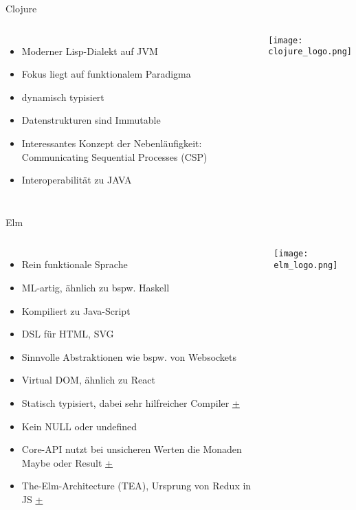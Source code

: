 \documentclass[compress]{beamer}
\begin{document}
\begin{frame}{Clojure}
  \begin{columns}[c]
    \begin{itemize}
      \item Moderner Lisp-Dialekt auf JVM
      \item Fokus liegt auf funktionalem Paradigma
      \item dynamisch typisiert
      \item Datenstrukturen sind Immutable
      \item Interessantes Konzept der Nebenläufigkeit: Communicating Sequential Processes (CSP)
      \item Interoperabilität zu JAVA
    \end{itemize}
    \texttt{[image: clojure\_logo.png]}
  \end{columns}
\end{frame}

\begin{frame}{Elm}
  \begin{columns}[c]
    \begin{itemize}
      \item Rein funktionale Sprache
      \item ML-artig, ähnlich zu bspw. Haskell
      \item Kompiliert zu Java-Script
      \item DSL für HTML, SVG
      \item Sinnvolle Abstraktionen wie bspw. von Websockets
      \item Virtual DOM, ähnlich zu React
      \item Statisch typisiert, dabei sehr hilfreicher Compiler \href{http://elm-lang.org/blog/compiler-errors-for-humans}{\color{orange}+}
      \item Kein NULL oder undefined
      \item Core-API nutzt bei unsicheren Werten die Monaden Maybe oder Result \href{https://guide.elm-lang.org/error_handling/maybe.html}{\color{orange}+}
      \item The-Elm-Architecture (TEA), Ursprung von Redux in JS \href{https://guide.elm-lang.org/architecture/}{\color{orange}+}
    \end{itemize}
    \texttt{[image: elm\_logo.png]}
  \end{columns}
\end{frame}
\end{document}
